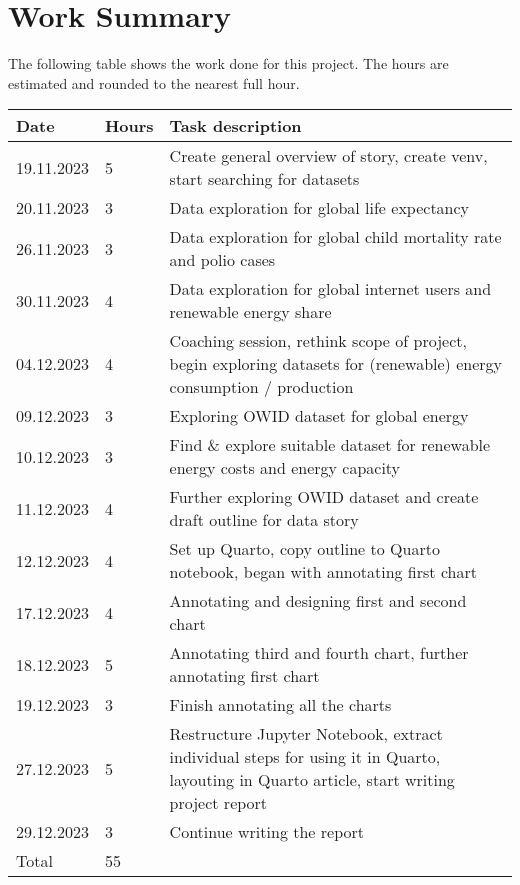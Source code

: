 \documentclass{article}
\begin{document}
\newpage

\section{Work Summary}

The following table shows the work done for this project.
The hours are estimated and rounded to the nearest full hour.

\begin{table}[!ht]
    \centering
    \begin{tabular}{|p{2cm}|p{1cm}|p{7.5cm}|}
    \hline
        \textbf{Date} & \textbf{Hours} & \textbf{Task description} \\ \hline
        19.11.2023 & 5 & Create general overview of story, create venv, start searching for datasets \\ \hline
        20.11.2023 & 3 & Data exploration for global life expectancy \\ \hline
        26.11.2023 & 3 & Data exploration for global child mortality rate and polio cases \\ \hline
        30.11.2023 & 4 & Data exploration for global internet users and renewable energy share \\ \hline
        04.12.2023 & 4 & Coaching session, rethink scope of project, begin exploring datasets for (renewable) energy consumption / production \\ \hline
        09.12.2023 & 3 & Exploring OWID dataset for global energy \\ \hline
        10.12.2023 & 3 & Find \& explore suitable dataset for renewable energy costs and energy capacity \\ \hline
        11.12.2023 & 4 & Further exploring OWID dataset and create draft outline for data story \\ \hline
        12.12.2023 & 4 & Set up Quarto, copy outline to Quarto notebook, began with annotating first chart \\ \hline
        17.12.2023 & 4 & Annotating and designing first and second chart \\ \hline
        18.12.2023 & 5 & Annotating third and fourth chart, further annotating first chart \\ \hline
        19.12.2023 & 3 & Finish annotating all the charts \\ \hline
        27.12.2023 & 5 & Restructure Jupyter Notebook, extract individual steps for using it in Quarto, layouting in Quarto article, start writing project report \\ \hline
        29.12.2023 & 3 & Continue writing the report \\ \hline
        \hline
        Total & 55 &  \\ \hline
    \end{tabular}
\end{table}
\end{document}
